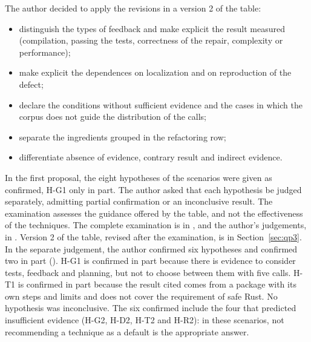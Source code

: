 The author decided to apply the revisions in a version 2 of the table:
\begin{itemize}
  \item distinguish the types of feedback and make explicit the result measured (compilation, passing the tests,
  correctness of the repair, complexity or performance);
  \item make explicit the dependences on localization and on reproduction of the defect;
  \item declare the conditions without sufficient evidence and the cases in which the corpus does not guide the distribution of the
  calls;
  \item separate the ingredients grouped in the refactoring row;
  \item differentiate absence of evidence, contrary result and indirect evidence.
\end{itemize}
In the first proposal, the eight hypotheses of the scenarios were given as confirmed, H-G1 only in part. The author asked
that each hypothesis be judged separately, admitting partial confirmation or an inconclusive result. The examination assesses the
guidance offered by the table, and not the effectiveness of the techniques. The complete examination is in
, and the author's judgements, in
.
Version 2 of the table, revised after the examination, is in Section~\ref{sec:qp3}. In the separate judgement, the author confirmed six hypotheses and confirmed two in part
(). H-G1 is confirmed in part because there is evidence to
consider tests, feedback and planning, but not to choose between them with five calls. H-T1 is
confirmed in part because the result cited comes from a package with its own steps and limits and does not cover the requirement
of safe Rust. No hypothesis was inconclusive. The six confirmed include the four that predicted insufficient
evidence (H-G2, H-D2, H-T2 and H-R2): in these scenarios, not recommending a technique as a default is the appropriate
answer.
